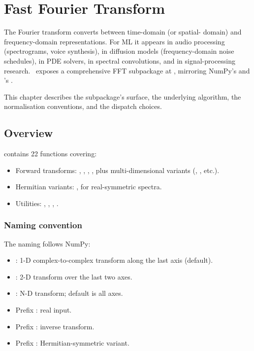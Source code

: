 \chapter{Fast Fourier Transform}
\label{ch:fft}

The Fourier transform converts between time-domain (or spatial-
domain) and frequency-domain representations. For ML it appears
in audio processing (spectrograms, voice synthesis), in
diffusion models (frequency-domain noise schedules), in PDE
solvers, in spectral convolutions, and in signal-processing
research. \Lucid\ exposes a comprehensive FFT subpackage at
, mirroring NumPy's  and
's .

This chapter describes the subpackage's surface, the underlying
algorithm, the normalisation conventions, and the dispatch
choices.

\section{Overview}
\label{sec:fft:overview}

 contains 22 functions covering:

\begin{itemize}
  \item Forward transforms: , , ,
    , plus multi-dimensional variants
    (, , etc.).
  \item Hermitian variants: ,  for
    real-symmetric spectra.
  \item Utilities: , ,
    , .
\end{itemize}

\subsection{Naming convention}
\label{ssec:fft:naming}

The naming follows NumPy:

\begin{itemize}
  \item {}: 1-D complex-to-complex transform along the
    last axis (default).
  \item {}: 2-D transform over the last two axes.
  \item {}: N-D transform; default is all axes.
  \item Prefix : real input.
  \item Prefix : inverse transform.
  \item Prefix : Hermitian-symmetric variant.
\end{itemize}

